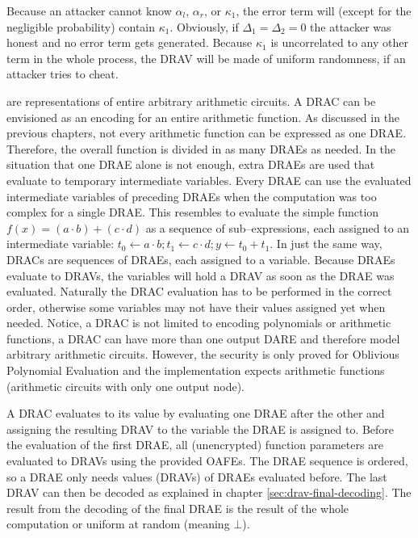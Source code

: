 \noindent{}Because an attacker cannot know $\alpha_l$, $\alpha_r$, or
$\kappa_1$, the error term will (except for the negligible probability) contain
$\kappa_1$. Obviously, if $\Delta_1 = \Delta_2 = 0$ the attacker was honest and
no error term gets generated. Because $\kappa_1$ is uncorrelated to any other
term in the whole process, the DRAV will be made of uniform randomness, if an
attacker tries to cheat.


%
%
\label{sec:drac}

 are representations of entire
arbitrary arithmetic circuits. A DRAC can be envisioned as an encoding for an
entire arithmetic function. As discussed in the previous chapters, not every
arithmetic function can be expressed as one DRAE\@. Therefore, the overall
function is divided in as many DRAEs as needed. In the situation that one DRAE
alone is not enough, extra DRAEs are used that evaluate to temporary
intermediate variables. Every DRAE can use the evaluated intermediate variables
of preceding DRAEs when the computation was too complex for a single DRAE\@.
This resembles to evaluate the simple function $f(x) = (a \cdot b) + (c \cdot
d)$ as a sequence of sub--expressions, each assigned to an intermediate
variable: $t_0 \leftarrow a \cdot b; t_1 \leftarrow c \cdot d; y \leftarrow t_0
+ t_1$.  In just the same way, DRACs are sequences of DRAEs, each assigned to a
variable.  Because DRAEs evaluate to DRAVs, the variables will hold a DRAV as
soon as the DRAE was evaluated. Naturally the DRAC evaluation has to be
performed in the correct order, otherwise some variables may not have their
values assigned yet when needed. Notice, a DRAC is not limited to encoding
polynomials or arithmetic functions, a DRAC can have more than one output DARE
and therefore model arbitrary arithmetic circuits. However, the security is
only proved for Oblivious Polynomial Evaluation and the implementation expects
arithmetic functions (arithmetic circuits with only one output node).


\label{sec:DRAC-eval}

A DRAC evaluates to its value by evaluating one DRAE after the other and
assigning the resulting DRAV to the variable the DRAE is assigned to. Before the
evaluation of the first DRAE, all (unencrypted) function parameters are
evaluated to DRAVs using the provided OAFEs. The DRAE sequence is ordered, so a
DRAE only needs values (DRAVs) of DRAEs evaluated before. The last DRAV can then
be decoded as explained in chapter \ref{sec:drav-final-decoding}. The result
from the decoding of the final DRAE is the result of the whole computation or
uniform at random (meaning $\bot$).


